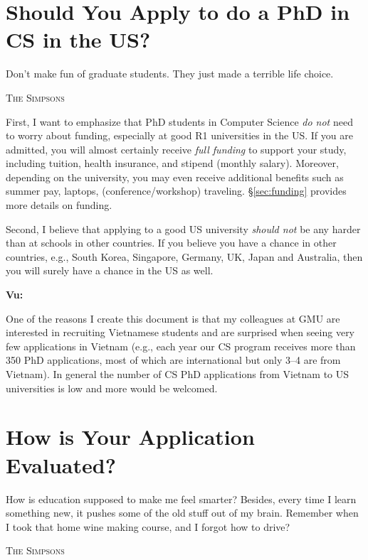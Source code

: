 \documentclass[11pt]{article}
\newenvironment{commentbox}[1][]{
\small
    \begin{cbox}
    \textbf{#1} 
 }{
   \end{cbox}
}
\begin{document}
\section{Should You Apply to do a PhD in CS in the US?}\label{sec:should}

\epigraph{\vspace{-0.2in} Don't make fun of graduate students. They just made a terrible life choice.}{\textsc{The Simpsons}}

First, I want to emphasize that PhD students in Computer Science \emph{do not} need to worry about funding, especially at good R1
universities in the US. If you are admitted, you will almost certainly
receive \emph{full funding} to support your study, including tuition,
health insurance, and stipend (monthly salary). Moreover, depending on the university,
you may even receive additional benefits such as summer pay, laptops, (conference/workshop) traveling. \S\ref{sec:funding} provides more details on funding.

Second, I believe that applying to a good US university \emph{should not} be any
harder than at schools in other countries. If you believe you have a chance in other countries, e.g., South Korea, Singapore, Germany, UK, Japan and Australia, then you will surely have a chance in the US as well.

\begin{commentbox}[Vu:]
One of the reasons I create this document is that my colleagues at GMU are interested in recruiting Vietnamese students and are surprised when seeing very few applications in Vietnam (e.g., each year our CS program receives more than 350 PhD applications, most of which are international but only 3--4 are from Vietnam). In general the number of CS PhD applications from Vietnam to US universities is low and more would be welcomed. 
\end{commentbox}



\section{How is Your Application Evaluated?}\label{sec:evalapps}

\epigraph{How is education supposed to make me feel smarter? Besides, every time I learn something new, it pushes some of the old stuff out of my brain. Remember when I took that home wine making course, and I forgot how to drive?}{\textsc{The Simpsons}}
\end{document}
